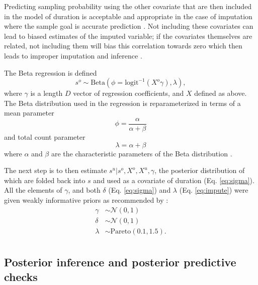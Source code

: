 \documentclass[11pt]{article}
\begin{document}
Predicting sampling probability using the other covariate that are then included in the model of duration is acceptable and appropriate in the case of imputation where the sample goal is accurate prediction \citep{Rubin1996,Gelman2007}. Not including these covariates can lead to biased estimates of the imputed variable; if the covariates themselves are related, not including them will bias this correlation towards zero which then leads to improper imputation and inference \citep{Rubin1996}.

The Beta regression is defined
\begin{equation}
  s^{o} \sim \mathrm{Beta}(\phi = \text{logit}^{-1}(X^{o} \gamma), \lambda),
  \label{eq:impute}
\end{equation}
where \(\gamma\) is a length \(D\) vector of regression coefficients, and \(X\) defined as above. The Beta distribution used in the regression is reparameterized in terms of a mean parameter
\begin{equation}
  \phi = \frac{\alpha}{\alpha + \beta}
\end{equation}
and total count parameter
\begin{equation}
  \lambda = \alpha + \beta
\end{equation}
where \(\alpha\) and \(\beta\) are the characteristic parameters of the Beta distribution \citep{Gelman2013d}.

The next step is to then estimate \(s^{u} | s^{o}, X^{o}, X^{u}, \gamma\), the posterior distribution of which are folded back into \(s\) and used as a covariate of duration (Eq. \ref{eq:sigma}). All the elements of \(\gamma\), and both \(\delta\) (Eq. \ref{eq:sigma}) and \(\lambda\) (Eq. \ref{eq:impute}) were given weakly informative priors as recommended by \citet{StanManual}:
\begin{equation}
  \begin{aligned}
    \gamma &\sim \mathcal{N}(0, 1) \\
    \delta &\sim \mathcal{N}(0, 1) \\
    \lambda &\sim \mathrm{Pareto}(0.1, 1.5). \\
  \end{aligned}
\end{equation}


\subsection*{Posterior inference and posterior predictive checks}
\end{document}
